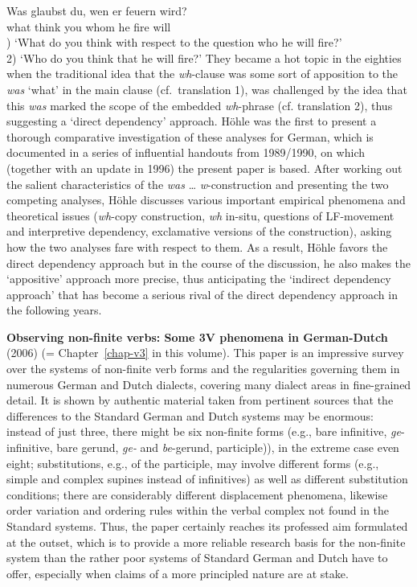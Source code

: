 \begin{refsection}
\ea
\gll	 Was  glaubst du,  wen      er  feuern  wird?\\
	 what think    you  whom  he  fire       will\\
) `What do you think with respect to the question who he will fire?'\\ 2) `Who do you think that he will fire?'
\z
%
They became a hot topic in the eighties when the traditional idea that the \emph{wh}-clause was some
sort of apposition to the \emph{was} `what' in the main clause (cf.\ translation 1), was challenged
by the idea that this \emph{was} marked the scope of the embedded \emph{wh}-phrase
(cf. translation 2), thus suggesting a `direct dependency' approach. Höhle was the first to present
a thorough comparative investigation of these analyses for German, which is documented in a series
of influential handouts from 1989/1990, on which (together with an update in 1996) the present paper
is based. After working out the salient characteristics of the \emph{was} \ldots{} \emph{w}-construction and presenting the two competing analyses, Höhle discusses various important empirical phenomena and theoretical issues (\emph{wh}-copy construction, \emph{wh} in-situ, questions of LF-movement and interpretive dependency, exclamative versions of the construction), asking how the two analyses fare with respect to them. As a result, Höhle favors the direct dependency approach but in the course of the discussion, he also makes the `appositive' approach more precise, thus anticipating the `indirect dependency approach' that has become a serious rival of the direct dependency approach in the following years.

\textbf{Observing non-finite verbs: Some 3V phenomena in German-Dutch} (2006) (= Chapter~\ref{chap-v3} in
this volume). This paper is an impressive survey over the systems of non-finite verb forms and the
regularities governing them in numerous German and Dutch dialects, covering many dialect areas in
fine-grained detail. It is shown by authentic material taken from pertinent sources that the
differences to the Standard German and Dutch systems may be enormous: instead of just three, there
might be six non-finite forms (e.g., bare infinitive, \emph{ge}-infinitive, bare gerund, \emph{ge-} and
\emph{be}-gerund, participle)), in the extreme case even eight; substitutions, e.g., of the participle, may involve different forms (e.g.,
simple and complex supines instead of infinitives) as well as different substitution conditions;
there are considerably different displacement phenomena, likewise order variation and ordering rules
within the verbal complex not found in the Standard systems. Thus, the paper certainly reaches its
professed aim formulated at the outset, which is to provide a more reliable research basis for the
non-finite system than the rather poor systems of Standard German and Dutch have
to offer, especially when claims of a more principled nature are at stake.  




\end{refsection}

